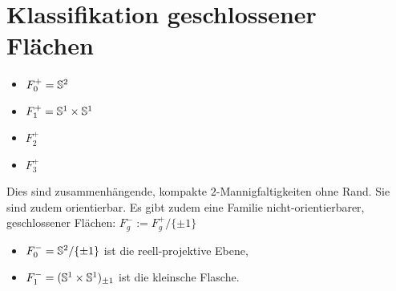 \section{Klassifikation geschlossener Flächen}


\begin{ex}
	\begin{itemize}
		\item
			$F_0^+ = \S^2$
		\item
			$F_1^+ = \S^1 \times \S^1$
		\item
			$F_2^+$
		\item
			$F_3^+$
	\end{itemize}
	Dies sind zusammenhängende, kompakte $2$-Mannigfaltigkeiten ohne Rand.
	Sie sind zudem orientierbar.
	Es gibt zudem eine Familie nicht-orientierbarer, geschlossener Flächen: $F_g^- := F_g^+ / \{\pm 1\}$
	\begin{itemize}
		\item
			$F_0^- = \S^2 / \{\pm 1\}$ ist die reell-projektive Ebene,
		\item
			$F_1^- = (\S^1 \times \S^1)_{\pm 1}$ ist die kleinsche Flasche.
	\end{itemize}
\end{ex}



